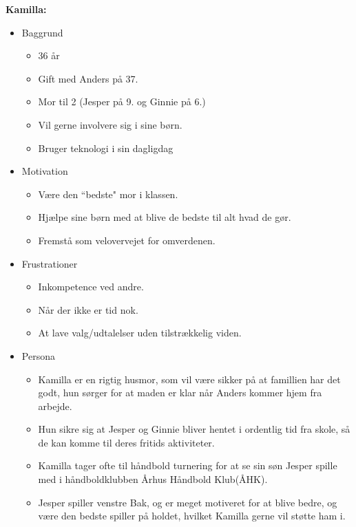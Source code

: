 \textbf{Kamilla:}
\begin{itemize}
\item 	Baggrund
	\begin{itemize}
	\item 36 år
	\item Gift med Anders på 37.
	\item Mor til 2 (Jesper på 9. og Ginnie på 6.)
	\item Vil gerne involvere sig i sine børn.
	\item Bruger teknologi i sin dagligdag
  	\end{itemize}	
\item Motivation
	\begin{itemize}
	\item Være den ``bedste" mor i klassen.
	\item Hjælpe sine børn med at blive de bedste til alt hvad de gør.
	\item Fremstå som velovervejet for omverdenen.
	\end{itemize}
\item Frustrationer
	\begin{itemize}
	\item Inkompetence ved andre.
	\item Når der ikke er tid nok.
	\item At lave valg/udtalelser uden tilstrækkelig viden.
	\end{itemize}
\item Persona
	\begin{itemize}
	\item Kamilla er en rigtig husmor, som vil være sikker på at famillien har det godt, hun sørger for at maden er klar når Anders kommer hjem fra arbejde.
	\item Hun sikre sig at Jesper og Ginnie bliver hentet i ordentlig tid fra skole, så de kan komme til deres fritids aktiviteter.
	\item Kamilla tager ofte til håndbold turnering for at se sin søn Jesper spille med i håndboldklubben Århus Håndbold Klub(ÅHK).
	\item Jesper spiller venstre Bak, og er meget motiveret for at blive bedre, og være den bedste spiller på holdet, hvilket Kamilla gerne vil støtte ham i.
	\end{itemize}
\end {itemize}

